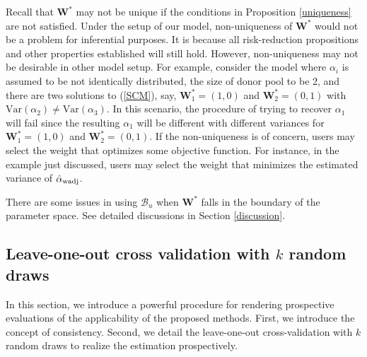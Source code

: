 \documentclass[11pt]{article}
\def\mc#1{\mathcal{#1}} %
\def\var#1{\mathrm{Var}(#1)} %
\theoremstyle{definition}
\begin{document}
Recall that $\mathbf{W}^*$  may not be unique if the conditions in Proposition \ref{uniqueness} are not satisfied. Under the setup of our model, non-uniqueness of $\mathbf{W}^*$ would not be a problem for inferential purposes. It is because all risk-reduction propositions and other properties established will still hold. However, non-uniqueness may not be desirable in other model setup. For example, consider the model where $\alpha_i$ is assumed to be not identically distributed, the size of  donor pool to be 2, and there are two solutions to (\ref{SCM}), say, $\mathbf{W}^*_1=(1,0)$ and  $\mathbf{W}^*_2=(0,1)$ with $\var{\alpha_2}\neq \var{\alpha_3}$. In this scenario, the procedure of trying to recover $\alpha_1$ will fail since the resulting $\alpha_1$ will be different with different variances for $\mathbf{W}^*_1=(1,0)$ and  $\mathbf{W}^*_2=(0,1)$. If the non-uniqueness is of concern, users may select the weight that optimizes some objective function. For instance, in the example just discussed, users may select the weight that minimizes the estimated variance of $\hat{\alpha}_{\rm wadj}$.

There are some issues in using $\mc{B}_u$ when $\mathbf{W}^*$ falls in the boundary of the parameter space. See detailed discussions in Section \ref{discussion}.

\subsection{Leave-one-out cross validation with $k$ random draws}
\label{loocv}

In this section, we introduce a powerful procedure for rendering prospective evaluations of the applicability of the proposed methods. First, we introduce the concept of consistency. Second, we detail the leave-one-out cross-validation with $k$ random draws to realize the estimation prospectively.
\end{document}
